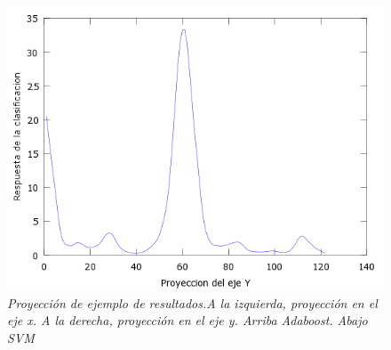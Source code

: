 \begin{figure}[htc]
  \includegraphics[scale=.4]{images/plots/svm7Y}
  \caption{\em  Proyección de ejemplo de resultados.A la izquierda, proyección en el eje x. A la derecha, proyección en el eje y. Arriba Adaboost. Abajo SVM}   
  \label{fig:pro7}
\end{figure}
